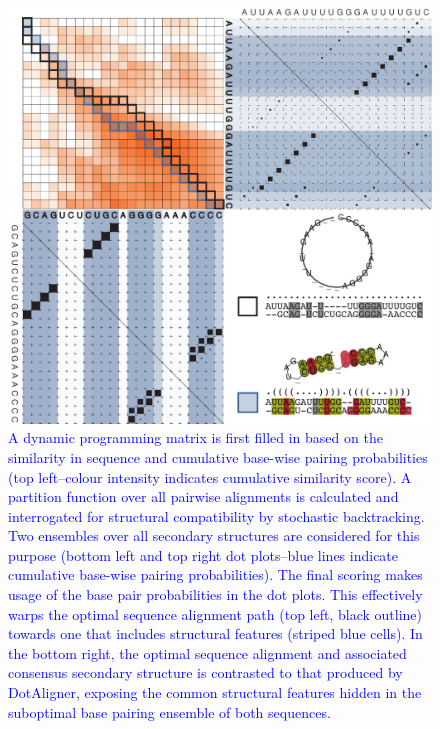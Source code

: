 \documentclass{bmcart}
\begin{document}
\begin{backmatter}
\begin{figure}[h!]
\includegraphics[width=\textwidth]{Fig1}
 \caption {
 \textcolor{blue}{
  A dynamic  programming matrix is first filled in based on the similarity in sequence 
  and cumulative base-wise pairing probabilities (top left--colour intensity
  indicates cumulative similarity score).  A partition function over all
  pairwise alignments is calculated and interrogated for structural
  compatibility by stochastic backtracking.  Two ensembles over all
  secondary structures are considered for this purpose (bottom left and
  top right dot plots--blue lines indicate cumulative base-wise pairing
  probabilities). The final scoring makes usage of the base pair
  probabilities in the dot plots. This effectively warps the optimal
  sequence alignment path (top left, black outline) towards one that
  includes structural features (striped blue cells).  In the bottom
  right, the optimal sequence alignment and associated consensus
  secondary structure is contrasted to that produced by DotAligner,
  exposing the common structural features hidden in the suboptimal base
  pairing ensemble of both sequences. 
 }}
\end{figure}



\end{backmatter}
\end{document}
